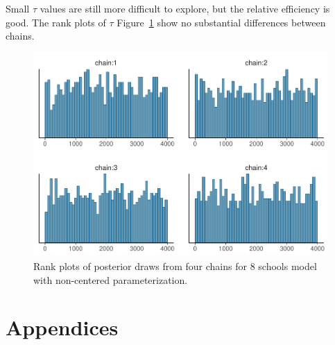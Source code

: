 \documentclass[american,]{article}
\providecommand{\tightlist}{%
  \setlength{\itemsep}{0pt}\setlength{\parskip}{0pt}}
\begin{document}
Small $\tau$ values are still more difficult to explore, but the
relative efficiency is good.
%
The rank plots of $\tau$ Figure~\ref{fig:hist-fit-ncp2-1} show no
substantial differences between chains.
\begin{figure}[tp]
  \centering
  \includegraphics[width=0.6\linewidth]{graphics/hist-fit-ncp2-1.pdf}
  \caption{Rank plots of posterior draws from four chains for 8 schools model with non-centered parameterization.}
  \label{fig:hist-fit-ncp2-1}
\end{figure}

\FloatBarrier



\hypertarget{appendices}{%
\section*{Appendices}\label{appendices}}



\end{document}

